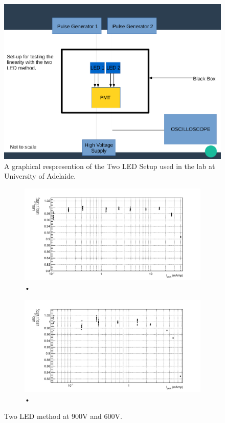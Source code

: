 \begin{figure}
\centering
\includegraphics[width=\textwidth]{chapters/graphs/PMTchar/diagram_TwoLEDmethod.pdf}
\caption{A graphical respresention of the Two LED Setup used in the lab at University of Adelaide.}
\label{fig:TwoLEDmethod_Setup}
\end{figure}

\begin{figure}
\centering
\begin{subfigure}[b]{\textwidth}
\includegraphics[width=\textwidth]{chapters/graphs/PMTchar/PMT900V_linearity2LEDmethod.pdf}
\caption{•}
\end{subfigure}
\begin{subfigure}[b]{\textwidth}
\includegraphics[width=\textwidth]{chapters/graphs/PMTchar/PMT600V_linearity2LEDmethod.pdf}
\caption{•}
\end{subfigure}
\caption{Two LED method at 900V and 600V.} \label{fig:TwoLEDmethod_result}
\end{figure}

